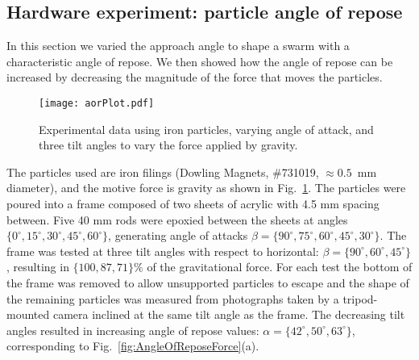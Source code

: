 \subsection{Hardware experiment: particle angle of repose}
In this section we varied the approach angle to shape a swarm with a characteristic angle of repose.  
We then showed how the angle of repose can be increased by decreasing the magnitude of the force that moves the particles.
%
\begin{figure}
\begin{center}
	\texttt{[image: aorPlot.pdf]}
\end{center}
\vspace{-1.5em}
\caption{\label{fig:angleOfReposeExp}
Experimental data using iron particles, varying angle of attack, and three tilt angles to vary the force applied by gravity.
}\vspace{-1.5em}
\end{figure}
%
%
The particles used are iron filings (Dowling Magnets, \#731019, $\approx0.5$~mm diameter), and the motive force is gravity as shown in Fig.~\ref{fig:angleOfReposeExp}. 
The particles were poured into a frame composed of two sheets of acrylic with 4.5 mm spacing between. Five 40 mm rods were epoxied between the sheets at angles 
 $\{0^\circ,15^\circ, 30^\circ, 45^\circ, 60^\circ \}$, generating angle of attacks $\beta = \{90^\circ,75^\circ, 60^\circ, 45^\circ, 30^\circ \}$.
 The frame was tested at three tilt angles with respect to horizontal: $\beta = \{90^\circ,60^\circ, 45^\circ \}$, resulting in $\{100,87, 71\}\%$ of the gravitational force.
 For each test the bottom of the frame was removed to allow unsupported particles to escape and the shape of the remaining particles was measured from photographs taken by a tripod-mounted camera inclined at the same tilt angle as the frame.
  The decreasing tilt angles resulted in increasing angle of repose values: $\alpha = \{42^\circ,50^\circ, 63^\circ \}$, corresponding to Fig.~\ref{fig:AngleOfReposeForce}(a).

